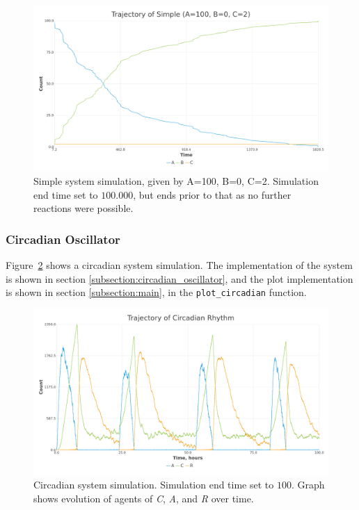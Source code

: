 \begin{figure}[H]
\centering
\includegraphics[width=1\textwidth,height=\textheight,keepaspectratio]{images/simple.png}
\caption{Simple system simulation, given by A=100, B=0, C=2. Simulation end time set to $100.000$, but ends prior to that as no further reactions were possible.}
\label{fig:simple_sim}
\end{figure}

\subsubsection{Circadian Oscillator}
Figure~\ref{fig:circadian_sim} shows a circadian system simulation.
The implementation of the system is shown in section \ref{subsection:circadian_oscillator}, and the plot implementation is shown in section \ref{subsection:main}, in the \texttt{plot\_circadian} function.

\begin{figure}[H]
\centering
\includegraphics[width=1\textwidth,height=\textheight,keepaspectratio]{images/circadian.png}
\caption{Circadian system simulation. Simulation end time set to $100$. Graph shows evolution of agents of \textit{C}, \textit{A}, and \textit{R} over time.}
\label{fig:circadian_sim}
\end{figure}

